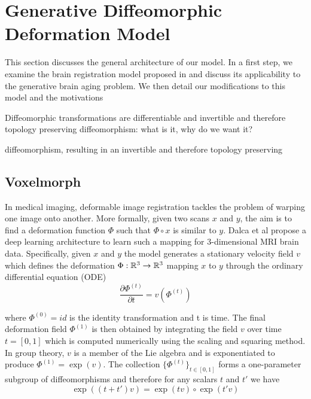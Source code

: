 \chapter{Generative Diffeomorphic Deformation Model}

This section discusses the general architecture of our model. In a first step, we examine the brain registration model proposed in \cite{voxelmorph} and discuss its applicability to the generative brain aging problem. We then detail our modifications to this model and the motivations

Diffeomorphic transformations are differentiable and invertible and therefore topology preserving
diffeomorphism: what is it, why do we want it?

diffeomorphism, resulting in an invertible and therefore topology preserving 

\section{Voxelmorph}
In medical imaging, deformable image registration tackles the problem of warping one image onto another. More formally, given two scans $x$ and $y$, the aim is to find a deformation function $\Phi$ such that $\Phi \circ x$ is similar to $y$.
Dalca et al propose a deep learning architecture
to learn such a mapping for 3-dimensional MRI brain data. Specifically, given $x$ and $y$ the model generates a stationary velocity field $v$ which defines the deformation ${\Phi : \mathbb{R}^3 \rightarrow \mathbb{R}^3}$ mapping $x$ to $y$ through the ordinary differential equation (ODE)
\begin{equation} \label{eq:ODE}
	\frac{\partial \Phi^{(t)}}{\partial t} = v(\Phi^{(t)})
\end{equation}

where $\Phi^{(0)} = id$ is the identity transformation and t is time.
The final deformation field $\Phi^{(1)}$ is then obtained by integrating the field $v$ over time $t = [0, 1]$ which is computed numerically using the scaling and squaring method.\\
In group theory, $v$ is a member of the Lie algebra and is exponentiated to produce $\Phi^{(1)} = \exp(v)$.
The collection $\{\Phi^{(t)}\}_{t \in [0,1]}$ forms a one-parameter subgroup of diffeomorphisms and therefore for any scalars $t$ and $t'$ we have 
\begin{equation}
	\exp((t + t')v) = \exp(tv) \circ \exp(t'v)
\end{equation}

